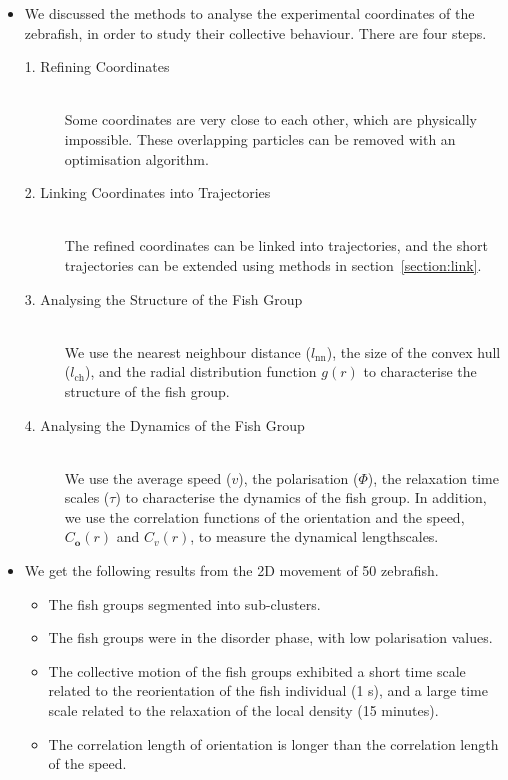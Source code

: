 \documentclass[11pt,twoside]{report}
\begin{document}
\begin{adjustwidth}{-5cm}{0cm}
\begin{tcolorbox}[
fonttitle=\sffamily\Large,
right=0.05\linewidth,
title=Summary of Chapter~5
]
\begin{itemize}
	\item We discussed the methods to analyse the experimental coordinates of the zebrafish, in order to study their collective behaviour. There are four steps.
	\begin{description}
		\item[1. Refining Coordinates] \hfill \\
		Some coordinates are very close to each other, which are physically impossible. These overlapping particles can be removed with an optimisation algorithm.
		\item[2. Linking Coordinates into Trajectories] \hfill \\
		The refined coordinates can be linked into trajectories, and the short trajectories can be extended using methods in section~\ref{section:link}.
		\item[3. Analysing the Structure of the Fish Group] \hfill \\
		We use the nearest neighbour distance ($l_\mathrm{nn}$), the size of the convex hull ($l_\mathrm{ch}$), and the radial distribution function $g(r)$ to characterise the structure of the fish group.
		\item[4. Analysing the Dynamics of the Fish Group] \hfill \\
		We use the average speed ($v$), the polarisation ($\Phi$), the relaxation time scales ($\tau$) to characterise the dynamics of the fish group.
		In addition, we use the correlation functions of the orientation and the speed, $C_\mathbf{o}(r)$ and $C_v(r)$, to measure the dynamical lengthscales.
		\end{description}
	\item We get the following results from the 2D movement of 50 zebrafish.
	\begin{itemize}
		\item The fish groups segmented into sub-clusters.
		\item The fish groups were in the disorder phase, with low polarisation values.
		\item The collective motion of the fish groups exhibited a short time scale related to the reorientation of the fish individual (1 s), and a large time scale related to the relaxation of the local density (15 minutes).
		\item The correlation length of orientation is longer than the correlation length of the speed.

\end{itemize}
\end{itemize}
\end{tcolorbox}
\end{adjustwidth}
\end{document}

